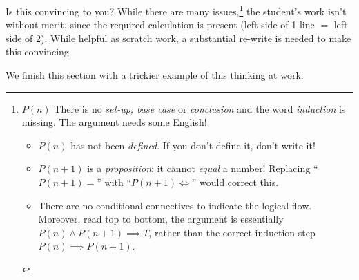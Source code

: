 Is this convincing to you? While there are many issues,\footnote{\textbullet\lstsp $P(n)$ There is no \emph{set-up, base case} or \emph{conclusion} and the word \emph{induction} is missing. The argument needs some English!
\begin{itemize}\itemsep0pt
  \item $P(n)$ has not been \emph{defined}. If you don't define it, don't write it!
  \item $P(n+1)$ is a \emph{proposition}: it cannot \emph{equal} a number! Replacing ``$P(n+1)=$'' with ``$P(n+1)\Longleftrightarrow$'' would correct this.
  \item There are no conditional connectives to indicate the logical flow. Moreover, read top to bottom, the argument is essentially $P(n)\wedge P(n+1)\implies T$, rather than the correct induction step $P(n)\implies P(n+1)$.
\end{itemize}} the student's work isn't without merit, since the required calculation is present (left side of 1\st{} line $=$ left side of 2\nd). While helpful as scratch work, a substantial re-write is needed to make this convincing.
\medbreak

We finish this section with a trickier example of this thinking at work.

